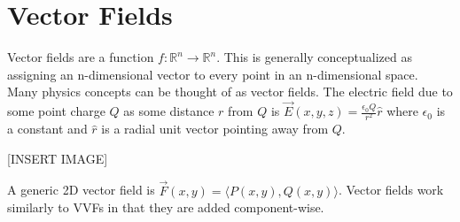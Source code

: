 \section{Vector Fields}
\noindent
Vector fields are a function $f : \mathbb{R}^n \to \mathbb{R}^n$. This is generally conceptualized as assigning an n-dimensional vector to every point in an n-dimensional space.\\
Many physics concepts can be thought of as vector fields. The electric field due to some point charge $Q$ as some distance $r$ from $Q$ is $\vec{E}(x,y,z) = \frac{\epsilon_{0}Q}{r^2}\hat{r}$ where $\epsilon_{0}$ is a constant and $\hat{r}$ is a radial unit vector pointing away from $Q$.

[INSERT IMAGE]

\noindent
A generic 2D vector field is $\vec{F}(x,y) = \langle P(x,y), Q(x,y) \rangle$. Vector fields work similarly to VVFs in that they are added component-wise.\\